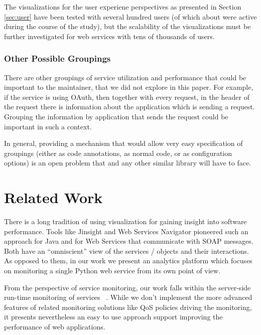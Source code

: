 \documentclass{sig-alternate-05-2015}
\begin{document}
    The visualizations for the user experiene perspectives as presented in Section \ref{sec:user} have been tested with several hundred users (of which about \activeUserCount were active during the course of the study), but the scalability of the visualizations must be further investigated for web services with tens of thousands of users.


  \subsubsection{Other Possible Groupings}

    There are other groupings of service utilization and performance that could be important to the maintainer, that we did not explore in this paper. For example, if the service is using OAuth, then together with every request, in the header of the request there is information about the application which is sending a request. Grouping the information by application that sends the request could be important in such a context. 

    In general, providing a mechanism that would allow very easy specification of groupings (either as code annotations, as normal code, or as configuration options) is an open problem that \tool and any other similar library will have to face.



\section{Related Work}
\label{sec:related}


There is a long tradition of using visualization for gaining insight into software performance. Tools like Jinsight \cite{Pauw02a} and Web Services Navigator \cite{Pauw05} pioneered such an approach for Java and for Web Services that communicate with SOAP messages. Both have an ``omniscient'' view of the services / objects and their interactions. As opposed to them, in our work we present an analytics platform which focuses on monitoring a single Python web service from its own point of view.

From the perspective of service monitoring, our work falls within the server-side run-time monitoring of services ~\cite{ghezzi2007run}. While we don't implement the more advanced features of related monitoring solutions like QoS policies driving the monitoring, it presents nevertheless an easy to use approach support improving the performance of web applications. 
\end{document}
